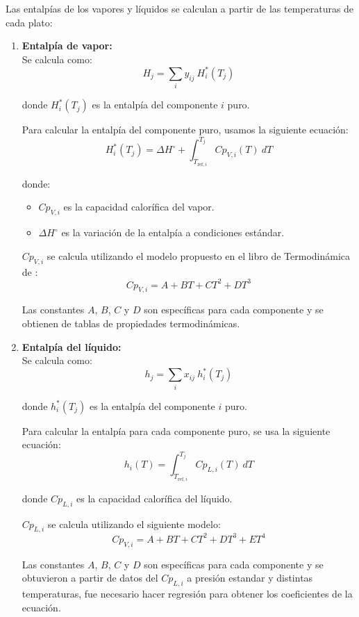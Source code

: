 Las entalpías de los vapores y líquidos se calculan a partir de las temperaturas de cada plato:
\begin{enumerate}
    \item \textbf{Entalpía de vapor:}\\
          Se calcula como:
          $$
              H_j = \sum_i y_{ij}\ H^*_i(T_j)
          $$

          donde $H^*_i(T_j)$ es la entalpía del componente $i$ puro.

          Para calcular la entalpía del componente puro, usamos la siguiente ecuación:
          $$
              H^*_i(T_j) = \Delta H^\circ + \int_{T_{\text{ref}, i}}^{T_j} Cp_{V, i}(T)\  dT
          $$

          donde:
          \begin{itemize}
              \item $Cp_{V, i}$ es la capacidad calorífica del vapor.
              \item $\Delta H^\circ$ es la variación de la entalpía a condiciones estándar.
          \end{itemize}

          $Cp_{V, i}$ se calcula utilizando el modelo propuesto en el libro de Termodinámica de \citeauthor{termo_cengel_god}:
          $$
              Cp_{V, i} = A + BT + CT^2 + DT^3
          $$

          Las constantes $A$, $B$, $C$ y $D$ son específicas para cada componente y se obtienen de tablas de propiedades termodinámicas.

    \item \textbf{Entalpía del líquido:}\\
          Se calcula como:
          $$
              h_j = \sum_i x_{ij}\ h^*_i(T_j)
          $$

          donde $h^*_i(T_j)$ es la entalpía del componente $i$ puro.

          Para calcular la entalpía para cada componente puro, se usa la siguiente ecuación:
          $$
              h_{i}(T) = \int_{T_{\text{ref}, i}}^{T_j} Cp_{L, i}(T)\  dT
          $$

          donde $Cp_{L, i}$ es la capacidad calorífica del líquido.

          $Cp_{L, i}$ se calcula utilizando el siguiente modelo:
          $$
              Cp_{V, i} = A + BT + CT^2 + DT^3 + ET^4
          $$

          Las constantes $A$, $B$, $C$ y $D$ son específicas para cada componente y se obtuvieron a partir de datos del $Cp_{L, i}$ a presión estandar y distintas temperaturas, fue necesario hacer regresión para obtener los coeficientes de la ecuación.


\end{enumerate}
